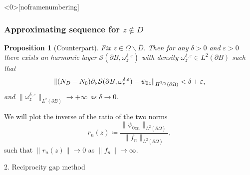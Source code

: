 \documentclass[10pt,xcolor={dvipsnames}]{beamer}
\newtheorem{proposition}[subsection]{Proposition}
\theoremstyle{plain}
\theoremstyle{plain}
\let\epsilon\varepsilon
\begin{document}
\begin{frame}<0>[noframenumbering]
 \frametitle{Approximating sequence for $z\notin D$}
 \begin{proposition}[Counterpart]
\label{prop:lsm-counterpart}
Fix $z \in \Omega\backslash\overline{D}$. Then for any $\delta>0$ and $\epsilon > 0$ there exists an harmonic layer $\mathcal{S}(\partial B, \omega^{\delta, \epsilon}_z)$ with density $\omega^{\delta, \epsilon}_z\in L^2(\partial B)$ such that
\begin{equation}
 \|({N_D} - {N_0})\partial_\nu\mathcal{S}(\partial B, \omega^{\delta,\epsilon}_z) - \psi_{0z}\|_{H^{\nicefrac{1}{2}}(\partial\Omega)} < \delta + \epsilon,
\end{equation}
and $\|\omega^{\delta, \epsilon}_z\|_{L^2(\partial B)}\to + \infty$ as $\delta\to 0$.
\end{proposition}
We will plot the inverse of the ratio of the two norms
\begin{equation}
 r_n(z)\coloneqq\frac{\|\psi_{0zn}\|_{L^2(\partial \Omega)}}{\|f_n\|_{L^2(\partial \Omega)}},
\end{equation}
such that $\|r_n(z)\|\to 0$ as $\|f_n\|\to \infty$.

\end{frame}
\begin{frame}[noframenumbering]
\begin{center}
\Large
{\color{purple}2. Reciprocity gap method}
\end{center}

\end{frame}
\end{document}
